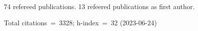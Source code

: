 74 refereed publications. 13 refeered publications as first author.

Total citations~=~3328; h-index~=~32 (2023-06-24)